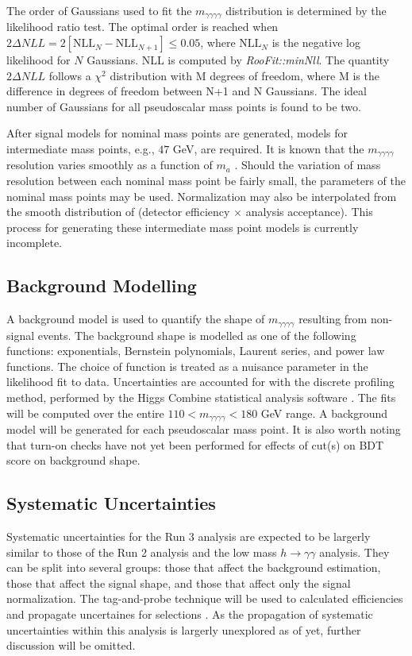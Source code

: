 \documentclass[12pt]{article}
\begin{document}
The order of Gaussians used to fit the $m_{\gamma \gamma \gamma \gamma}$ distribution is determined by the likelihood ratio test. The optimal order is reached when $2\Delta NLL = 2[\text{NLL}_{N} - \text{NLL}_{N+1}] \leq 0.05$, where $\text{NLL}_{N}$ is the negative log likelihood for $N$ Gaussians. NLL is computed by \textit{RooFit::minNll}. The quantity $2\Delta NLL$ follows a $\chi^2$ distribution with M degrees of freedom, where M is the difference in degrees of freedom between N+1 and N Gaussians. The ideal number of Gaussians for all pseudoscalar mass points is found to be two.\par

After signal models for nominal mass points are generated, models for intermediate mass points, e.g., $47$ GeV, are required. It is known that the $m_{\gamma\gamma\gamma\gamma}$ resolution varies smoothly as a function of $m_{a}$ \cite{Run2_analysis}. Should the variation of mass resolution between each nominal mass point be fairly small, the parameters of the nominal mass points may be used. Normalization may also be interpolated from the smooth distribution of (detector efficiency $\times$ analysis acceptance). This process for generating these intermediate mass point models is currently incomplete.\par

\subsection{Background Modelling}
A background model is used to quantify the shape of $m_{\gamma\gamma\gamma\gamma}$ resulting from non-signal events. The background shape is modelled as one of the following functions: exponentials, Bernstein polynomials, Laurent series, and power law functions. The choice of function is treated as a nuisance parameter in the likelihood fit to data. Uncertainties are accounted for with the discrete profiling method, performed by the Higgs Combine statistical analysis software \cite{discrete-profiling, higgs-combine}. The fits will be computed over the entire $110 < m_{\gamma\gamma\gamma\gamma} < 180$ GeV range. A background model will be generated for each pseudoscalar mass point. It is also worth noting that turn-on checks have not yet been performed for effects of cut(s) on BDT score on background shape.\par

\subsection{Systematic Uncertainties}
Systematic uncertainties for the Run 3 analysis are expected to be largerly similar to those of the Run 2 analysis and the low mass $h\rightarrow \gamma\gamma$ analysis. They can be split into several groups: those that affect the background estimation, those that affect the signal shape, and those that affect only the signal normalization. The tag-and-probe technique will be used to calculated efficiencies and propagate uncertaines for selections \cite{Chatrchyan2011}. As the propagation of systematic uncertainties within this analysis is largerly unexplored as of yet, further discussion will be omitted.\par
\end{document}
